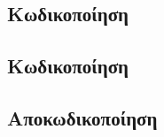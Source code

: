 \subsection{Κωδικοποίηση }
\en{\lipsum[1]}
\subsection{Κωδικοποίηση }
\en{\lipsum[1]}
\subsection{Αποκωδικοποίηση }
\en{\lipsum[1]}
















